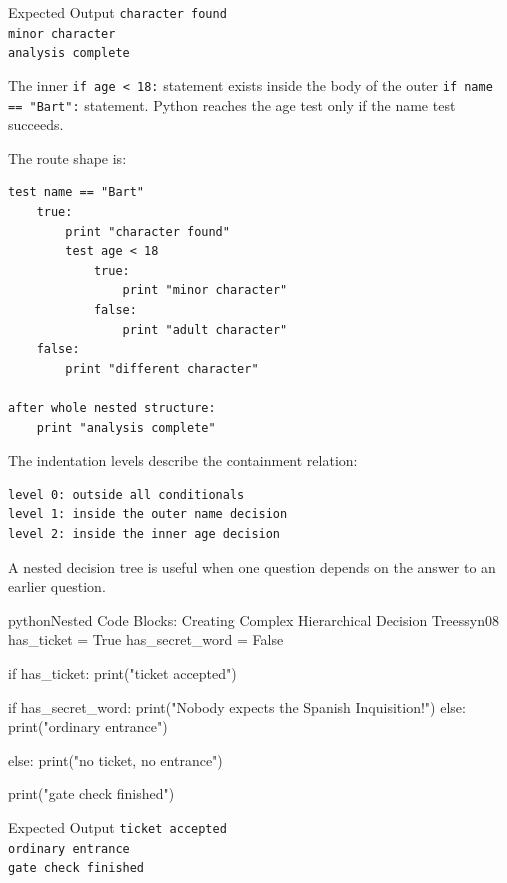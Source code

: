 \documentclass[a4paper,twoside]{report}
\begin{document}
\begin{iobox}{Expected Output}
\texttt{character found} \\
\texttt{minor character} \\
\texttt{analysis complete} \\
\end{iobox}


The inner \texttt{if age < 18:} statement exists inside the body of the outer \texttt{if name == "Bart":} statement. Python reaches the age test only if the name test succeeds.

The route shape is:

\begin{verbatim}
test name == "Bart"
    true:
        print "character found"
        test age < 18
            true:
                print "minor character"
            false:
                print "adult character"
    false:
        print "different character"

after whole nested structure:
    print "analysis complete"
\end{verbatim}

The indentation levels describe the containment relation:

\begin{verbatim}
level 0: outside all conditionals
level 1: inside the outer name decision
level 2: inside the inner age decision
\end{verbatim}

A nested decision tree is useful when one question depends on the answer to an earlier question.

\begin{codebox}[]{python}{Nested Code Blocks: Creating Complex Hierarchical Decision Trees}{syn08}
has_ticket = True
has_secret_word = False

if has_ticket:
    print("ticket accepted")

    if has_secret_word:
        print("Nobody expects the Spanish Inquisition!")
    else:
        print("ordinary entrance")

else:
    print("no ticket, no entrance")

print("gate check finished")
\end{codebox}


\begin{iobox}{Expected Output}
\texttt{ticket accepted} \\
\texttt{ordinary entrance} \\
\texttt{gate check finished} \\
\end{iobox}
\end{document}
